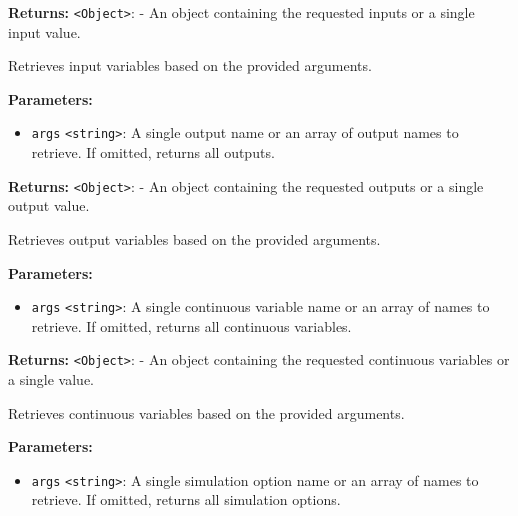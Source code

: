 \documentclass[12pt,a4paper]{article}
\begin{document}
\noindent \textbf{Returns:} \texttt{<Object>}: - An object containing the requested inputs or a single input value.

\noindent Retrieves input variables based on the provided arguments.

\vspace{5mm}
\noindent {}


\noindent \textbf{Parameters:}
\begin{itemize}
  \item \texttt{args} \texttt{<string>}: A single output name or an array of output names to retrieve. If omitted, returns all outputs.
\end{itemize}

\noindent \textbf{Returns:} \texttt{<Object>}: - An object containing the requested outputs or a single output value.

\noindent Retrieves output variables based on the provided arguments.

\vspace{5mm}
\noindent {}


\noindent \textbf{Parameters:}
\begin{itemize}
  \item \texttt{args} \texttt{<string>}: A single continuous variable name or an array of names to retrieve. If omitted, returns all continuous variables.
\end{itemize}

\noindent \textbf{Returns:} \texttt{<Object>}: - An object containing the requested continuous variables or a single value.

\noindent Retrieves continuous variables based on the provided arguments.

\vspace{5mm}
\noindent {}


\noindent \textbf{Parameters:}
\begin{itemize}
  \item \texttt{args} \texttt{<string>}: A single simulation option name or an array of names to retrieve. If omitted, returns all simulation options.
\end{itemize}
\end{document}
